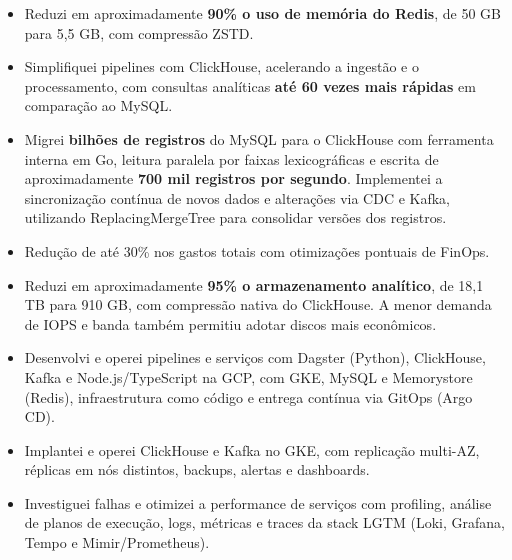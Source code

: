 \documentclass[a4paper,11pt]{article}
\begin{document}
\begin{itemize}
\item 
              Reduzi em aproximadamente \textbf{90\% o uso de memória do Redis},
              de 50 GB para 5,5 GB, com compressão ZSTD.
            
\item 
              Simplifiquei pipelines com ClickHouse, acelerando a ingestão e o
              processamento, com consultas analíticas
              \textbf{até 60 vezes mais rápidas} em comparação ao MySQL.
            
\item 
              Migrei \textbf{bilhões de registros} do MySQL para o ClickHouse
              com ferramenta interna em Go, leitura paralela por faixas lexicográficas
              e escrita de aproximadamente \textbf{700 mil registros por segundo}.
              Implementei a sincronização contínua de novos dados e alterações via CDC
              e Kafka, utilizando ReplacingMergeTree para consolidar versões dos registros.
            
\item 
              Redução de até 30\% nos gastos totais com otimizações pontuais de FinOps.
            
\item 
              Reduzi em aproximadamente \textbf{95\% o armazenamento analítico},
              de 18,1 TB para 910 GB, com compressão nativa do ClickHouse. A menor demanda
              de IOPS e banda também permitiu adotar discos mais econômicos.
            
\item 
              Desenvolvi e operei pipelines e serviços com Dagster (Python),
              ClickHouse, Kafka e Node.js/TypeScript na GCP, com GKE, MySQL e Memorystore
              (Redis), infraestrutura como código e entrega contínua via GitOps (Argo CD).
            
\item 
              Implantei e operei ClickHouse e Kafka no GKE, com replicação
              multi-AZ, réplicas em nós distintos, backups, alertas e dashboards.
            
\item 
              Investiguei falhas e otimizei a performance de serviços com profiling,
              análise de planos de execução, logs, métricas e traces da stack LGTM
              (Loki, Grafana, Tempo e Mimir/Prometheus).
            
\end{itemize}
\newpage
\end{document}
